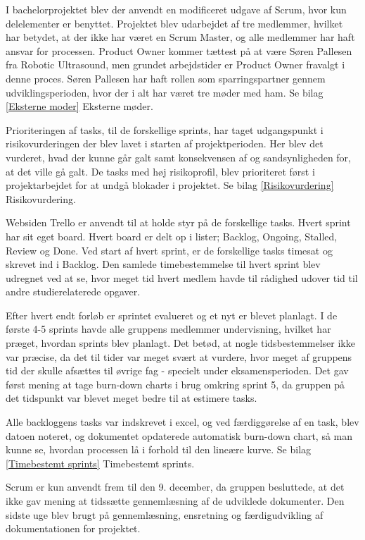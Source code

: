 I bachelorprojektet blev der anvendt en modificeret udgave af Scrum, hvor kun delelementer er benyttet. Projektet blev udarbejdet af tre medlemmer, hvilket har betydet, at der ikke har været en Scrum Master, og alle medlemmer har haft ansvar for processen. Product Owner kommer tættest på at være Søren Pallesen fra Robotic Ultrasound, men grundet arbejdstider er Product Owner fravalgt i denne proces. Søren Pallesen har haft rollen som sparringspartner gennem udviklingsperioden, hvor der i alt har været tre møder med ham. Se bilag \ref{Eksterne moder} Eksterne møder. 

Prioriteringen af tasks, til de forskellige sprints, har taget udgangspunkt i risikovurderingen der blev lavet i starten af projektperioden. Her blev det vurderet, hvad der kunne går galt samt konsekvensen af og sandsynligheden for, at det ville gå galt. De tasks med høj risikoprofil, blev prioriteret først i projektarbejdet for at undgå blokader i projektet. Se bilag \ref{Risikovurdering} Risikovurdering.  

Websiden Trello er anvendt til at holde styr på de forskellige tasks. Hvert sprint har sit eget board. Hvert board er delt op i lister; Backlog, Ongoing, Stalled, Review og Done. Ved start af hvert sprint, er de forskellige tasks timesat og skrevet ind i Backlog. Den samlede timebestemmelse til hvert sprint blev udregnet ved at se, hvor meget tid hvert medlem havde til rådighed udover tid til andre studierelaterede opgaver. 

Efter hvert endt forløb er sprintet evalueret og et nyt er blevet planlagt. I de første 4-5 sprints havde alle gruppens medlemmer undervisning, hvilket har præget, hvordan sprints blev planlagt. Det betød, at nogle tidsbestemmelser ikke var præcise, da det til tider var meget svært at vurdere, hvor meget af gruppens tid der skulle afsættes til øvrige fag - specielt under eksamensperioden. Det gav først mening at tage burn-down charts i brug omkring sprint 5, da gruppen på det tidspunkt var blevet meget bedre til at estimere tasks.

Alle backloggens tasks var indskrevet i excel, og ved færdiggørelse af en task, blev datoen noteret, og dokumentet opdaterede automatisk burn-down chart, så man kunne se, hvordan processen lå i forhold til den lineære kurve. Se bilag \ref{Timebestemt sprints} Timebestemt sprints. 

Scrum er kun anvendt frem til den 9. december, da gruppen besluttede, at det ikke gav mening at tidssætte gennemlæsning af de udviklede dokumenter. Den sidste uge blev brugt på gennemlæsning, ensretning og færdigudvikling af dokumentationen for projektet.  


